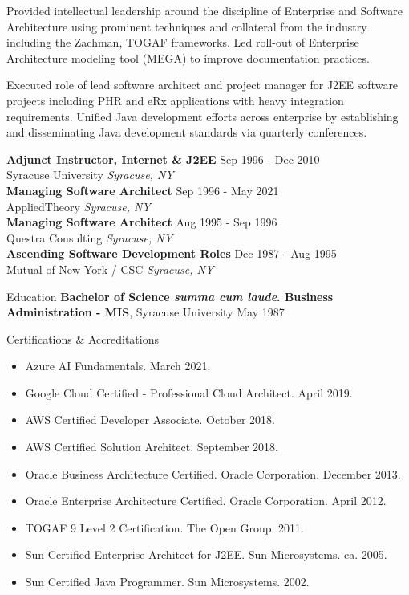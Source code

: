 \documentclass{resume} %
\begin{document}
Provided intellectual leadership around the discipline of Enterprise and Software Architecture using prominent techniques and collateral from the industry including the Zachman, TOGAF frameworks. Led roll-out of Enterprise Architecture modeling tool (MEGA) to improve documentation practices. 

Executed role of lead software architect and project manager for J2EE software projects including PHR and eRx applications with heavy integration requirements. Unified Java development efforts across enterprise by establishing and disseminating Java development standards via quarterly conferences.

\textbf{Adjunct Instructor, Internet \& J2EE} \hfill Sep 1996 - Dec 2010\\
Syracuse University \hfill \textit{Syracuse, NY}\\
\textbf{Managing Software Architect} \hfill Sep 1996 - May 2021\\
AppliedTheory \hfill \textit{Syracuse, NY}\\
\textbf{Managing Software Architect} \hfill Aug 1995 - Sep 1996\\
Questra Consulting \hfill \textit{Syracuse, NY}\\
\textbf{Ascending Software Development Roles} \hfill Dec 1987 - Aug 1995\\
Mutual of New York / CSC \hfill \textit{Syracuse, NY}\\

\begin{rSection}{Education}
{\bf Bachelor of Science \emph{summa cum laude}. Business Administration - MIS}, Syracuse University \hfill {May 1987}\\
\end{rSection}

\begin{rSection}{Certifications \& Accreditations}
\begin{itemize}
  \item Azure AI Fundamentals. March 2021.
  \item Google Cloud Certified - Professional Cloud Architect. April 2019.
  \item AWS Certified Developer Associate. October 2018.
  \item AWS Certified Solution Architect. September 2018.
  \item Oracle Business Architecture Certified. Oracle Corporation. December 2013.
  \item Oracle Enterprise Architecture Certified. Oracle Corporation. April 2012.
  \item TOGAF 9 Level 2 Certification. The Open Group. 2011.
  \item Sun Certified Enterprise Architect for J2EE. Sun Microsystems. ca. 2005.
  \item Sun Certified Java Programmer. Sun Microsystems. 2002.
\end{itemize}
\end{rSection}
\end{document}
